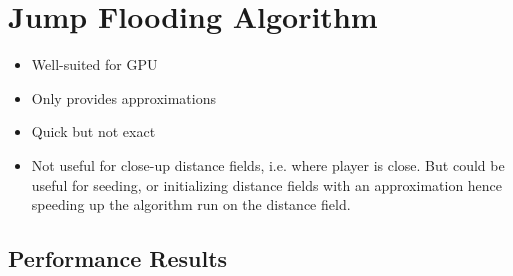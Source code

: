 \section{Jump Flooding Algorithm}
\begin{itemize}
    \item Well-suited for GPU
    \item Only provides approximations
    \item Quick but not exact
    \item Not useful for close-up distance fields, i.e. where player is close. But could be useful for seeding, or
          initializing distance fields with an approximation hence speeding up the algorithm run on the distance field.
\end{itemize}

\subsection{Performance Results}

\begin{table}[h]
    \centering
    \vspace{0.5em}
    \caption{Distance field compute shader execution time using the JFA algorithm.}
\end{table}

